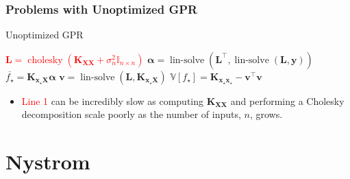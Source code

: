 \documentclass[9pt,hyperref={pdfpagelabels=false},xcolor=table]{beamer}
\begin{document}
\begin{frame}
    \frametitle{Problems with Unoptimized GPR}
    {\centering
        \begin{minipage}{.9\linewidth}
            \begin{algorithm}[H]
                \caption{Unoptimized GPR}
                \SetAlgoLined
                \DontPrintSemicolon

                \BlankLine
                \textcolor{red}{$\bm{L} = \operatorname{cholesky} \left( \bm{K_{XX}} + \sigma_n^2 \mathbb{I}_{n \times n} \right)$}\;
                $\bm{\alpha} = \operatorname{lin-solve} \left( \bm{L}^{\intercal} , \operatorname{lin-solve} \left( \bm{L}, \bm{y} \right) \right)$\;
                $\overline{f_{\star}} = \bm{K_{x_{\star} X}} \bm{\alpha}$\;
                $\bm{v} = \operatorname{lin-solve} \left( \bm{L}, \bm{K_{x_{\star} X}} \right)$\;
                $\mathbb{V} \left[ f_{\star} \right] = \bm{K_{x_{\star} x_{\star}}} - \bm{v}^{\intercal} \bm{v}$\;
                \BlankLine
            \end{algorithm}
        \end{minipage}
        \par
    }
    \begin{itemize}
        \item \textcolor{red}{Line 1} can be incredibly slow as computing $\bm{K_{XX}}$ and performing a Cholesky decomposition scale poorly as the number of inputs, $n$, grows.
    \end{itemize}
\end{frame}

\section{Nystrom}
\end{document}
